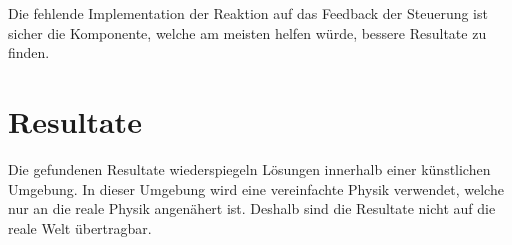     Die fehlende Implementation der Reaktion auf das Feedback der Steuerung ist sicher die Komponente,
    welche am meisten helfen würde, bessere Resultate zu finden.

  \section{Resultate}

    Die gefundenen Resultate wiederspiegeln Lösungen innerhalb einer künstlichen Umgebung.
    In dieser Umgebung wird eine vereinfachte Physik verwendet, welche nur an die reale Physik angenähert ist.
    Deshalb sind die Resultate nicht auf die reale Welt übertragbar.

